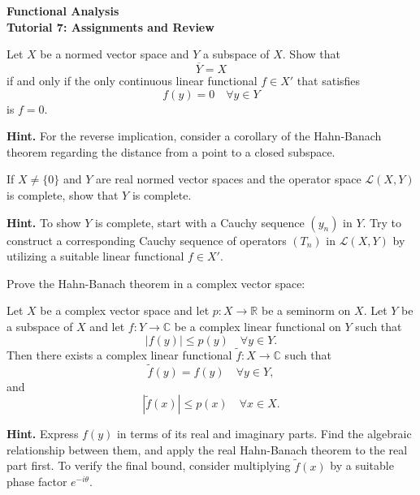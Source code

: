 \documentclass{article}
\begin{document}
\begin{center}
    \Large\textbf{
        Functional Analysis\\
        \vspace{1em}
        Tutorial 7: Assignments and Review
    }
    \date{}
\end{center}
\vspace{2em}
\begin{problem}
Let $X$ be a normed vector space and $Y$ a subspace of $X$. Show that
\[ \overline{Y} = X \]
if and only if the only continuous linear functional $f \in X'$ that satisfies
\[ f(y) = 0 \quad \forall y \in Y \]
is $f = 0$.

\noindent \textbf{Hint.} For the reverse implication, consider a corollary of the Hahn-Banach theorem regarding the distance from a point to a closed subspace.
\end{problem}

\begin{problem}
If $X \ne \{0\}$ and $Y$ are real normed vector spaces and the operator space $\mathcal{L}(X,Y)$ is complete, show that $Y$ is complete.

\noindent \textbf{Hint.} To show $Y$ is complete, start with a Cauchy sequence $(y_n)$ in $Y$. Try to construct a corresponding Cauchy sequence of operators $(T_n)$ in $\mathcal{L}(X,Y)$ by utilizing a suitable linear functional $f \in X'$.
\end{problem}

\begin{problem}
Prove the Hahn-Banach theorem in a complex vector space:

Let $X$ be a complex vector space and let $p: X \rightarrow \mathbb{R}$ be a seminorm on $X$. Let $Y$ be a subspace of $X$ and let $f: Y \rightarrow \mathbb{C}$ be a complex linear functional on $Y$ such that
\[ |f(y)| \le p(y) \quad \forall y \in Y. \]
Then there exists a complex linear functional $\tilde{f}: X \rightarrow \mathbb{C}$ such that
\[ \tilde{f}(y) = f(y) \quad \forall y \in Y, \]
and
\[ |\tilde{f}(x)| \le p(x) \quad \forall x \in X. \]

\noindent \textbf{Hint.} Express $f(y)$ in terms of its real and imaginary parts. Find the algebraic relationship between them, and apply the real Hahn-Banach theorem to the real part first. To verify the final bound, consider multiplying $\tilde{f}(x)$ by a suitable phase factor $e^{-i\theta}$.
\end{problem}
\end{document}
